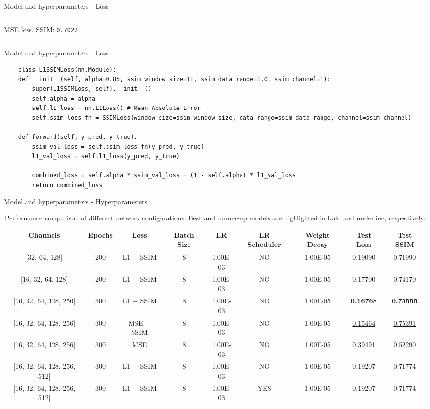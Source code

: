 \documentclass[8pt]{beamer}
\begin{document}
\begin{frame}{Model and hyperparameters - Loss}
\begin{columns}
            \newline
            \centering \small MSE loss. SSIM: \texttt{0.7022}
    \end{columns}
\end{frame}

\begin{frame}[fragile]{Model and hyperparameters - Loss}
    \begin{lstlisting}
    class L1SSIMLoss(nn.Module):
    def __init__(self, alpha=0.85, ssim_window_size=11, ssim_data_range=1.0, ssim_channel=1):
        super(L1SSIMLoss, self).__init__()
        self.alpha = alpha
        self.l1_loss = nn.L1Loss() # Mean Absolute Error
        self.ssim_loss_fn = SSIMLoss(window_size=ssim_window_size, data_range=ssim_data_range, channel=ssim_channel)

    def forward(self, y_pred, y_true):
        ssim_val_loss = self.ssim_loss_fn(y_pred, y_true)
        l1_val_loss = self.l1_loss(y_pred, y_true)
        
        combined_loss = self.alpha * ssim_val_loss + (1 - self.alpha) * l1_val_loss
        return combined_loss
    \end{lstlisting}
\end{frame}

\begin{frame}{Model and hyperparameters - Hyperparameters}
    \begin{table}[ht]
        \centering
        \small
        \scriptsize
        \begin{tabular}{|c|c|c|c|c|c|c|c|c|}
        \hline
        \textbf{Channels} & \textbf{Epochs} & \textbf{Loss} & \textbf{Batch Size} & \textbf{LR} & \textbf{LR Scheduler} & \textbf{Weight Decay} & \textbf{Test Loss} & \textbf{Test SSIM} \\
        \hline
        {[}32, 64, 128{]} & 200 & L1 + SSIM & 8 & 1.00E-03 & NO & 1.00E-05 & 0.19090 & 0.71990 \\
        {[}16, 32, 64, 128{]} & 200 & L1 + SSIM & 8 & 1.00E-03 & NO & 1.00E-05 & 0.17700 & 0.74170 \\
        {[}16, 32, 64, 128, 256{]} & 300 & L1 + SSIM & 8 & 1.00E-03 & NO & 1.00E-05 & \textbf{0.16768} & \textbf{0.75555} \\
        {[}16, 32, 64, 128, 256{]} & 300 & MSE + SSIM & 8 & 1.00E-03 & NO & 1.00E-05 & \underline{0.15464} & \underline{0.75391} \\
        {[}16, 32, 64, 128, 256{]} & 300 & MSE & 8 & 1.00E-03 & NO & 1.00E-05 & 0.39491 & 0.52290 \\
        {[}16, 32, 64, 128, 256, 512{]} & 300 & L1 + SSIM & 8 & 1.00E-03 & NO & 1.00E-05 & 0.19207 & 0.71774 \\
        {[}16, 32, 64, 128, 256, 512{]} & 300 & L1 + SSIM & 8 & 1.00E-03 & YES & 1.00E-05 & 0.19207 & 0.71774 \\
        \hline
        \end{tabular}
        \caption{Performance comparison of different network configurations. Best and runner-up models are highlighted in bold and underline, respectively.}
    \end{table}
\end{frame}
\end{document}
